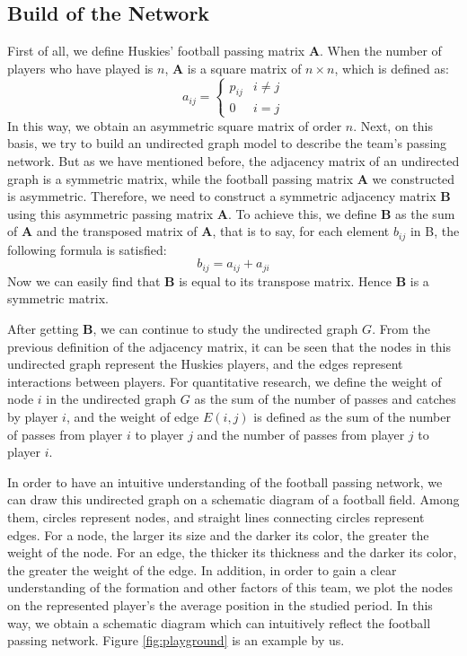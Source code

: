 \documentclass{mcmthesis}
\begin{document}
\subsection{Build of the Network}
	First of all, we define Huskies' football passing matrix $\textbf{A}$.  When the number of players who have played is $n$, $\textbf{A}$ is a square matrix of $n \times n$, which is defined as:
	\begin{equation}\label{eq:Mat_A}
		a_{ij} =
		\begin{cases}
			p_{ij}& \text{$i \neq j$}\\
			0& \text{$i = j$}
		\end{cases}
	\end{equation}
	In this way, we obtain an asymmetric square matrix of order $n$.  Next, on this basis, we try to build an undirected graph model to describe the team's passing network.  But as we have mentioned before, the adjacency matrix of an undirected graph is a symmetric matrix, while the football passing matrix $\textbf{A}$ we constructed is asymmetric.  Therefore, we need to construct a symmetric adjacency matrix $\textbf{B}$ using this asymmetric passing matrix $\textbf{A}$.  To achieve this, we define $\textbf{B}$ as the sum of $\textbf{A}$ and the transposed matrix of $\textbf{A}$, that is to say, for each element $b_{ij}$ in B, the following formula is satisfied:
	\begin{equation}
		\label{eq:Mat_B}
		b_{ij} = a_{ij} + a_{ji}
	\end{equation}
	Now we can easily find that $\textbf{B}$ is equal to its transpose matrix.  Hence $\textbf{B}$ is a symmetric matrix.

	After getting $\textbf{B}$, we can continue to study the undirected graph $G$.  From the previous definition of the adjacency matrix, it can be seen that the nodes in this undirected graph represent the Huskies players, and the edges represent interactions between players.  For quantitative research, we define the weight of node $i$ in the undirected graph $G$ as the sum of the number of passes and catches by player $i$, and the weight of edge $E (i, j)$ is defined as the sum of the number of passes from player $i$ to player $j$ and the number of passes from player $j$ to player $i$.
	
	In order to have an intuitive understanding of the football passing network, we can draw this undirected graph on a schematic diagram of a football field.  Among them, circles represent nodes, and straight lines connecting circles represent edges.  For a node, the larger its size and the darker its color, the greater the weight of the node.  For an edge, the thicker its thickness and the darker its color, the greater the weight of the edge.  In addition, in order to gain a clear understanding of the formation and other factors of this team, we plot the nodes on the represented player's the average position in the studied period.  In this way, we obtain a schematic diagram which can intuitively reflect the football passing network.  Figure \ref{fig:playground} is an example by us.
	
\end{document}
